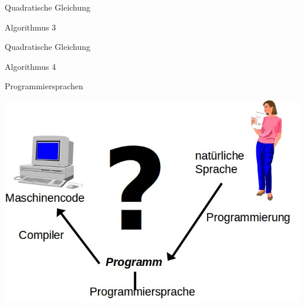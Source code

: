 \begin{frame}{Quadratische Gleichung}
    \begin{block}{Algorithmus 3}
        
    \end{block}
\end{frame}

\begin{frame}{Quadratische Gleichung}
    \begin{block}{Algorithmus 4}
        
    \end{block}
\end{frame}

\begin{frame}{Programmiersprachen}
    \begin{center}
        \includegraphics[scale=0.35]{img/programmiersprachen.jpg}
    \end{center}
\end{frame}

